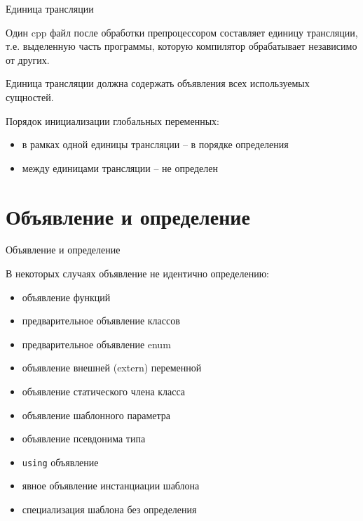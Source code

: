 \documentclass[unknownkeysallowed,xcolor=table]{beamer}
\begin{document}
\begin{frame}{Единица трансляции}

Один cpp файл после обработки препроцессором составляет единицу трансляции, т.е. выделенную часть программы, которую компилятор обрабатывает независимо от других.

\vspace{1.5em}

Единица трансляции должна содержать объявления всех используемых сущностей.

\vspace{1.5em}

Порядок инициализации глобальных переменных:
\begin{itemize}
  \item в рамках одной единицы трансляции -- в порядке определения
  \item между единицами трансляции -- не определен
\end{itemize}

\end{frame}


\section{Объявление и определение}

\begin{frame}{Объявление и определение}

В некоторых случаях объявление не идентично определению:
\begin{itemize}
  \item объявление функций \vspace{0.3em}
  \item предварительное объявление классов \vspace{0.3em}
  \item предварительное объявление enum \vspace{0.3em}
  \item объявление внешней (extern) переменной \vspace{0.3em}
  \item объявление статического члена класса \vspace{0.3em}
  \item объявление шаблонного параметра \vspace{0.3em}
  \item объявление псевдонима типа \vspace{0.3em}
  \item \lstinline{using} объявление  \vspace{0.3em}
  \item явное объявление инстанциации шаблона \vspace{0.3em}
  \item специализация шаблона без определения
\end{itemize}

\end{frame}
\end{document}
